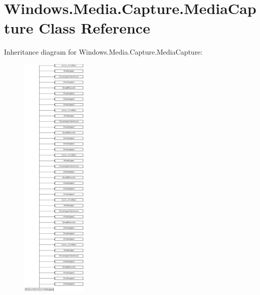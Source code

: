 \hypertarget{class_windows_1_1_media_1_1_capture_1_1_media_capture}{}\section{Windows.\+Media.\+Capture.\+Media\+Capture Class Reference}
\label{class_windows_1_1_media_1_1_capture_1_1_media_capture}
Inheritance diagram for Windows.\+Media.\+Capture.\+Media\+Capture\+:\begin{figure}[H]
\begin{center}
\leavevmode
\includegraphics[height=12.000000cm]{class_windows_1_1_media_1_1_capture_1_1_media_capture}
\end{center}
\end{figure}
